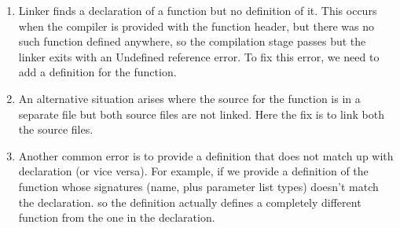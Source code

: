 \documentclass[
  course = {{ESE532 System-on-a-Chip}},
  quartile = {{}},
  assignment = 1,
  name = {{Sheil Sarda}},
  studentnumber = {{}},
  email = {{sheils@seas.upenn.edu}},
  firstexercise = 1
]{aga-homework}
\begin{document}
\subexercise
\renewcommand{\theenumi}{\roman{enumi}}%
\begin{enumerate}
	\item  Linker finds a declaration of a function but no definition of it. This occurs when the compiler is provided with the function header, but there was no such function defined anywhere, so the compilation stage passes but the linker exits with an Undefined reference error. To fix this error, we need to add a definition for the function.
	
	\item An alternative situation arises where the source for the function is in a separate file but both source files are not linked. Here the fix is to link both the source files.
	
	\item Another common error is to provide a definition that does not match up with declaration (or vice versa). For example, if we provide a definition of the function whose signatures (name, plus parameter list types) doesn't match the declaration. so the definition actually defines a completely different function from the one in the declaration. 
	
\end{enumerate}
\end{document}
